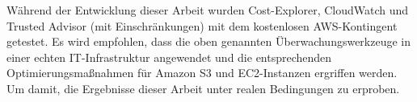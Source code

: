 Während der Entwicklung dieser Arbeit wurden Cost-Explorer, CloudWatch und Trusted Advisor (mit Einschränkungen) mit dem kostenlosen AWS-Kontingent getestet. Es wird empfohlen, dass die oben genannten Überwachungswerkzeuge in einer echten IT-Infrastruktur angewendet und die entsprechenden Optimierungsmaßnahmen für Amazon S3 und EC2-Instanzen ergriffen werden. Um damit, die Ergebnisse dieser Arbeit unter realen Bedingungen zu erproben. %
\\\\
